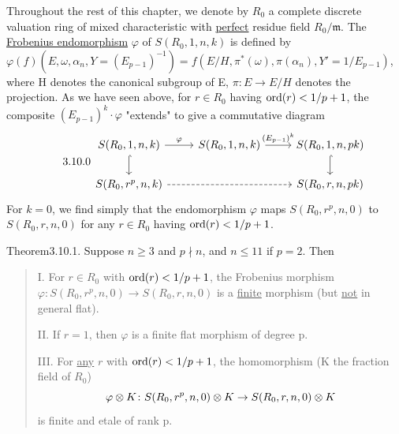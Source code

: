 
Throughout the rest of this chapter, we denote by $R_0$ a complete discrete
valuation ring of mixed characteristic with \uline{perfect} residue field
$R_0/\mathfrak{m}$. The \uline{Frobenius endomorphism} $\varphi$ of
$S(R_0,1,n,k)$ is defined by
$\varphi(f)(E,\omega,\alpha_n,Y=(E_{p-1})^{-1}) =
f(E/H,\pi^*(\omega),\pi(\alpha_n),Y'=1/E_{p-1})$, where H denotes the
canonical subgroup of E, $\pi\colon E\to E/H$ denotes the projection. As we
have seen above, for $r\in R_0$ having $\operatorname{ord}(r)<1/p+1$, the composite
$(E_{p-1})^k\cdot\varphi$ "extends" to give a commutative diagram
\begin{equation}\tag*{3.10.0}\label{ka:3.10.0}
\begin{tikzcd}
S(R_0,1,n,k) \arrow[r,"\varphi"] \arrow[d,hook] & S(R_0,1,n,k) \arrow[r,"(E_{p-1})^k"] & S(R_0,1,n,pk) \arrow[d,hook] \\
S(R_0,r^p,n,k) \arrow[rr,dashed] & & S(R_0,r,n,pk)
\end{tikzcd}
\end{equation}
For $k=0$, we find simply that the endomorphism $\varphi$ maps
$S(R_0,r^p,n,0)$ to $S(R_0,r,n,0)$ for any $r\in R_0$ having
$\operatorname{ord}(r)<1/p+1$.

\begin{kathm}{Theorem}{3.10.1.}
Suppose $n\geq 3$ and $p\nmid n$, and $n\leq 11$ if $p=2$. Then
\begin{quote}
I. For $r\in R_0$ with $\operatorname{ord}(r)<1/p+1$, the Frobenius morphism
$\varphi\colon S(R_0,r^p,n,0)\to S(R_0,r,n,0)$ is a \uline{finite} morphism
(but \uline{not} in general flat).

II. If $r=1$, then $\varphi$ is a finite flat morphism of degree p.

III. For \uline{any} $r$ with $\operatorname{ord}(r)<1/p+1$, the homomorphism (K the
fraction field of $R_0$)
\[
\varphi\otimes K\colon S(R_0,r^p,n,0)\otimes K\to S(R_0,r,n,0)\otimes K
\]
is finite and etale of rank p.
\end{quote}
\end{kathm}

